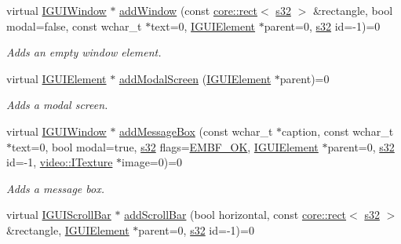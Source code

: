 \begin{DoxyCompactItemize}
virtual \hyperlink{classirr_1_1gui_1_1IGUIWindow}{I\+G\+U\+I\+Window} $\ast$ \hyperlink{classirr_1_1gui_1_1IGUIEnvironment_ac233dcbef643b5f7de9ab30ae5896e28}{add\+Window} (const \hyperlink{classirr_1_1core_1_1rect}{core\+::rect}$<$ \hyperlink{namespaceirr_ac66849b7a6ed16e30ebede579f9b47c6}{s32} $>$ \&rectangle, bool modal=false, const wchar\+\_\+t $\ast$text=0, \hyperlink{classirr_1_1gui_1_1IGUIElement}{I\+G\+U\+I\+Element} $\ast$parent=0, \hyperlink{namespaceirr_ac66849b7a6ed16e30ebede579f9b47c6}{s32} id=-\/1)=0
\begin{DoxyCompactList}\small\item\em Adds an empty window element. \end{DoxyCompactList}\item 
virtual \hyperlink{classirr_1_1gui_1_1IGUIElement}{I\+G\+U\+I\+Element} $\ast$ \hyperlink{classirr_1_1gui_1_1IGUIEnvironment_a8bdf2e97e3694da75205ad693d849219}{add\+Modal\+Screen} (\hyperlink{classirr_1_1gui_1_1IGUIElement}{I\+G\+U\+I\+Element} $\ast$parent)=0
\begin{DoxyCompactList}\small\item\em Adds a modal screen. \end{DoxyCompactList}\item 
virtual \hyperlink{classirr_1_1gui_1_1IGUIWindow}{I\+G\+U\+I\+Window} $\ast$ \hyperlink{classirr_1_1gui_1_1IGUIEnvironment_aaf8cad4624c26895523b22728098a917}{add\+Message\+Box} (const wchar\+\_\+t $\ast$caption, const wchar\+\_\+t $\ast$text=0, bool modal=true, \hyperlink{namespaceirr_ac66849b7a6ed16e30ebede579f9b47c6}{s32} flags=\hyperlink{namespaceirr_1_1gui_af55112e55731c9ad1b9fe9b372c521afa9660280349027f678b2315a15a23ba0e}{E\+M\+B\+F\+\_\+\+OK}, \hyperlink{classirr_1_1gui_1_1IGUIElement}{I\+G\+U\+I\+Element} $\ast$parent=0, \hyperlink{namespaceirr_ac66849b7a6ed16e30ebede579f9b47c6}{s32} id=-\/1, \hyperlink{classirr_1_1video_1_1ITexture}{video\+::\+I\+Texture} $\ast$image=0)=0
\begin{DoxyCompactList}\small\item\em Adds a message box. \end{DoxyCompactList}\item 
virtual \hyperlink{classirr_1_1gui_1_1IGUIScrollBar}{I\+G\+U\+I\+Scroll\+Bar} $\ast$ \hyperlink{classirr_1_1gui_1_1IGUIEnvironment_aff82c4b3935eaf56ce638996f5e002c9}{add\+Scroll\+Bar} (bool horizontal, const \hyperlink{classirr_1_1core_1_1rect}{core\+::rect}$<$ \hyperlink{namespaceirr_ac66849b7a6ed16e30ebede579f9b47c6}{s32} $>$ \&rectangle, \hyperlink{classirr_1_1gui_1_1IGUIElement}{I\+G\+U\+I\+Element} $\ast$parent=0, \hyperlink{namespaceirr_ac66849b7a6ed16e30ebede579f9b47c6}{s32} id=-\/1)=0

\end{DoxyCompactItemize}
